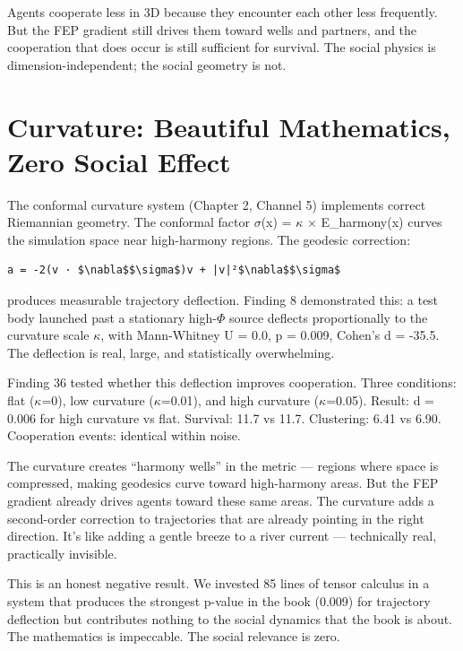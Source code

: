 Agents cooperate less in 3D because they encounter each other less frequently. But the FEP gradient still drives them toward wells and partners, and the cooperation that does occur is still sufficient for survival. The social physics is dimension-independent; the social geometry is not.

\section{Curvature: Beautiful Mathematics, Zero Social Effect}\label{curvature-beautiful-mathematics-zero-social-effect}

The conformal curvature system (Chapter 2, Channel 5) implements correct Riemannian geometry. The conformal factor $\sigma$(x) = $\kappa$ $\times$ E\_harmony(x) curves the simulation space near high-harmony regions. The geodesic correction:

\begin{verbatim}
a = -2(v · $\nabla$$\sigma$)v + |v|²$\nabla$$\sigma$
\end{verbatim}

produces measurable trajectory deflection. Finding 8 demonstrated this: a test body launched past a stationary high-$\Phi$ source deflects proportionally to the curvature scale $\kappa$, with Mann-Whitney U = 0.0, p = 0.009, Cohen's d = -35.5. The deflection is real, large, and statistically overwhelming.

Finding 36 tested whether this deflection improves cooperation. Three conditions: flat ($\kappa$=0), low curvature ($\kappa$=0.01), and high curvature ($\kappa$=0.05). Result: d = 0.006 for high curvature vs flat. Survival: 11.7 vs 11.7. Clustering: 6.41 vs 6.90. Cooperation events: identical within noise.

The curvature creates ``harmony wells'' in the metric --- regions where space is compressed, making geodesics curve toward high-harmony areas. But the FEP gradient already drives agents toward these same areas. The curvature adds a second-order correction to trajectories that are already pointing in the right direction. It's like adding a gentle breeze to a river current --- technically real, practically invisible.

This is an honest negative result. We invested 85 lines of tensor calculus in a system that produces the strongest p-value in the book (0.009) for trajectory deflection but contributes nothing to the social dynamics that the book is about. The mathematics is impeccable. The social relevance is zero.

